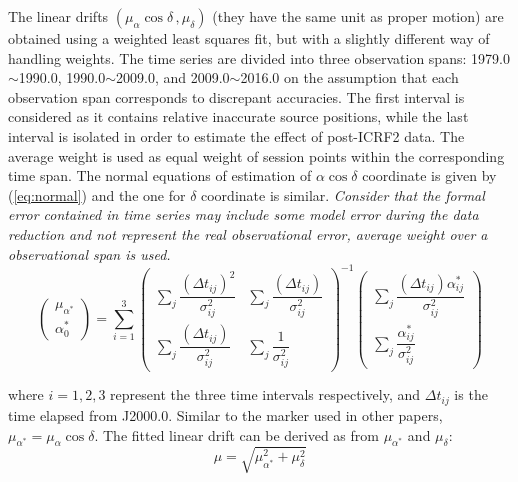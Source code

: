\documentclass{aa}
\begin{document}
The linear drifts $(\mu _{\alpha}\cos\delta\,,\mu_\delta)$ (they have the same unit as proper motion) are obtained using a weighted least squares fit, but with a slightly different way of handling weights. The time series are divided into three observation spans: 1979.0$\sim$1990.0, 1990.0$\sim$2009.0, and 2009.0$\sim$2016.0 on the assumption that each observation span corresponds to discrepant accuracies. The first interval is considered as it contains relative inaccurate source positions, while the last interval is isolated in order to estimate the effect of post-ICRF2 data. The average weight is used as equal weight of session points within the corresponding time span. The normal equations of estimation of $\alpha\cos\delta$ coordinate is given by (\ref{eq:normal}) and the one for $\delta$ coordinate is similar.
\emph{Consider that the formal error contained in time series may include some model error during the data reduction and not represent the real observational error, average weight over a observational span is used.}
\begin{equation}
\label{eq:normal}
\left(
	\begin{array}{c}
	\mu _{\alpha ^{*}} \\
	\alpha ^{*}_0
	\end{array}
\right)
	= \sum _{i=1}^3
\left(
	\begin{array}{cc}
	\sum\limits _j \dfrac{(\Delta t_{ij} )^2}{\sigma ^2_{ij}} & \sum\limits_j \dfrac{(\Delta t_{ij})}{\sigma ^2_{ij}} \\
	\sum\limits_j \dfrac{(\Delta t_{ij})}{\sigma ^2_{ij}}   & \sum\limits_j \dfrac{1}{\sigma ^2_{ij}}
	\end{array}
\right) ^{-1}
\left(
	\begin{array}{c}
	\sum\limits_j \dfrac{(\Delta t_{ij})\alpha ^{*}_{ij}}{\sigma ^2_{ij}} \\
	\sum\limits_j \dfrac{\alpha ^{*}_{ij}}{\sigma _{ij} ^2}
	\end{array}
\right)
\end{equation}

where $i=1, 2, 3$ represent the three time intervals respectively, and $\Delta t_{ij}$ is the time elapsed from J2000.0. Similar to the marker used in other papers, $\mu _{\alpha ^*} = \mu _{\alpha}\cos\delta$. The fitted linear drift can be derived as from $\mu_{\alpha^*}$ and $\mu_\delta$:
\begin{equation}
\mu = \sqrt{ \mu_{\alpha ^*}^2 + \mu ^2_\delta}
\end{equation}
\end{document}
